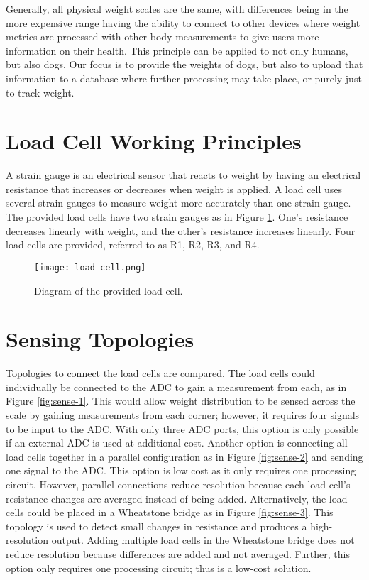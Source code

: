 Generally, all physical weight scales are the same, with differences being in the more expensive range having the ability to connect to other devices where weight metrics are processed with other body measurements to give users more information on their health. This principle can be applied to not only humans, but also dogs. Our focus is to provide the weights of dogs, but also to upload that information to a database where further processing may take place, or purely just to track weight.


\section{Load Cell Working Principles}

A strain gauge is an electrical sensor that reacts to weight by having an electrical resistance that increases or decreases when weight is applied. A load cell uses several strain gauges to measure weight more accurately than one strain gauge. The provided load cells have two strain gauges as in Figure \ref{fig:load_cell}. One’s resistance decreases linearly with weight, and the other’s resistance increases linearly. Four load cells are provided, referred to as R1, R2, R3, and R4.



\begin{figure}[!ht]
	\centering
	\texttt{[image: load-cell.png]}
	\caption{Diagram of the provided load cell.}
	\label{fig:load_cell}
\end{figure}


\section{Sensing Topologies}

Topologies to connect the load cells are compared. The load cells could individually be connected to the ADC to gain a measurement from each, as in Figure \ref{fig:sense-1}. This would allow weight distribution to be sensed across the scale by gaining measurements from each corner; however, it requires four signals to be input to the ADC. With only three ADC ports, this option is only possible if an external ADC is used at additional cost. Another option is connecting all load cells together in a parallel configuration as in Figure \ref{fig:sense-2} and sending one signal to the ADC. This option is low cost as it only requires one processing circuit. However, parallel connections reduce resolution because each load cell's resistance changes are averaged instead of being added. Alternatively, the load cells could be placed in a Wheatstone bridge as in Figure \ref{fig:sense-3}. This topology is used to detect small changes in resistance and produces a high-resolution output. Adding multiple load cells in the Wheatstone bridge does not reduce resolution because differences are added and not averaged. Further, this option only requires one processing circuit; thus is a low-cost solution. 




